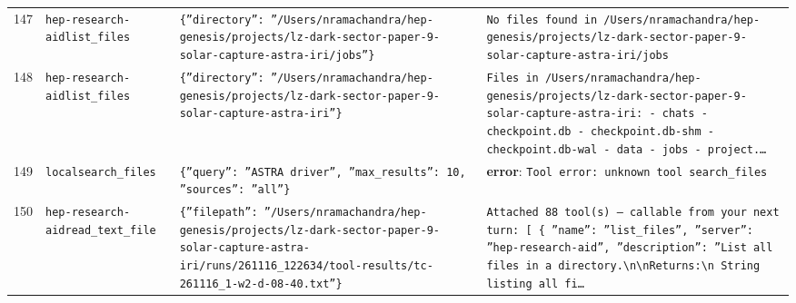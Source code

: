 \documentclass[11pt,a4paper]{article}
\begin{document}
\begin{longtable}{@{}p{}p{}p{}p{}@{}}
147 & \texttt{hep-research-aid}\newline\texttt{list\_\allowbreak{}files} & \texttt{\{''directory'':\allowbreak{} ''/\allowbreak{}Users/\allowbreak{}nramachandra/\allowbreak{}hep-genesis/\allowbreak{}projects/\allowbreak{}lz-dark-sector-paper-9-solar-capture-astra-iri/\allowbreak{}jobs''\}\allowbreak{}} & \texttt{No files found in /\allowbreak{}Users/\allowbreak{}nramachandra/\allowbreak{}hep-genesis/\allowbreak{}projects/\allowbreak{}lz-dark-sector-paper-9-solar-capture-astra-iri/\allowbreak{}jobs} \\
148 & \texttt{hep-research-aid}\newline\texttt{list\_\allowbreak{}files} & \texttt{\{''directory'':\allowbreak{} ''/\allowbreak{}Users/\allowbreak{}nramachandra/\allowbreak{}hep-genesis/\allowbreak{}projects/\allowbreak{}lz-dark-sector-paper-9-solar-capture-astra-iri''\}\allowbreak{}} & \texttt{Files in /\allowbreak{}Users/\allowbreak{}nramachandra/\allowbreak{}hep-genesis/\allowbreak{}projects/\allowbreak{}lz-dark-sector-paper-9-solar-capture-astra-iri:\allowbreak{}   - chats   - checkpoint.db   - checkpoint.db-shm   - checkpoint.db-wal   - data   - jobs   - project.\ldots{}\allowbreak{}} \\
149 & \texttt{local}\newline\texttt{search\_\allowbreak{}files} & \texttt{\{''query'':\allowbreak{} ''ASTRA driver'',\allowbreak{} ''max\_\allowbreak{}results'':\allowbreak{} 10,\allowbreak{} ''sources'':\allowbreak{} ''all''\}\allowbreak{}} & \textbf{error}: \texttt{Tool error:\allowbreak{} unknown tool search\_\allowbreak{}files} \\
150 & \texttt{hep-research-aid}\newline\texttt{read\_\allowbreak{}text\_\allowbreak{}file} & \texttt{\{''filepath'':\allowbreak{} ''/\allowbreak{}Users/\allowbreak{}nramachandra/\allowbreak{}hep-genesis/\allowbreak{}projects/\allowbreak{}lz-dark-sector-paper-9-solar-capture-astra-iri/\allowbreak{}runs/\allowbreak{}261116\_\allowbreak{}122634/\allowbreak{}tool-results/\allowbreak{}tc-261116\_\allowbreak{}1-w2-d-08-40.txt''\}\allowbreak{}} & \texttt{Attached 88 tool(s)\allowbreak{} --- callable from your next turn:\allowbreak{} [  \{   ''name'':\allowbreak{} ''list\_\allowbreak{}files'',\allowbreak{}   ''server'':\allowbreak{} ''hep-research-aid'',\allowbreak{}   ''description'':\allowbreak{} ''List all files in a directory.\textbackslash{}\allowbreak{}n\textbackslash{}\allowbreak{}nReturns:\allowbreak{}\textbackslash{}\allowbreak{}n    String listing all fi\ldots{}\allowbreak{}} \\

\end{longtable}
\end{document}
